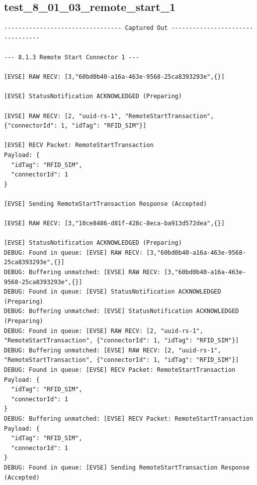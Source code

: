 \documentclass{article}
\begin{document}
\subsection*{test\_8\_01\_03\_remote\_start\_1}
\begin{lstlisting}
--------------------------------- Captured Out ---------------------------------

--- 8.1.3 Remote Start Connector 1 ---

[EVSE] RAW RECV: [3,"60bd0b40-a16a-463e-9568-25ca8393293e",{}]

[EVSE] StatusNotification ACKNOWLEDGED (Preparing)

[EVSE] RAW RECV: [2, "uuid-rs-1", "RemoteStartTransaction", {"connectorId": 1, "idTag": "RFID_SIM"}]

[EVSE] RECV Packet: RemoteStartTransaction
Payload: {
  "idTag": "RFID_SIM",
  "connectorId": 1
}

[EVSE] Sending RemoteStartTransaction Response (Accepted)

[EVSE] RAW RECV: [3,"10ce8486-d81f-428c-8eca-ba913d572dea",{}]

[EVSE] StatusNotification ACKNOWLEDGED (Preparing)
DEBUG: Found in queue: [EVSE] RAW RECV: [3,"60bd0b40-a16a-463e-9568-25ca8393293e",{}]
DEBUG: Buffering unmatched: [EVSE] RAW RECV: [3,"60bd0b40-a16a-463e-9568-25ca8393293e",{}]
DEBUG: Found in queue: [EVSE] StatusNotification ACKNOWLEDGED (Preparing)
DEBUG: Buffering unmatched: [EVSE] StatusNotification ACKNOWLEDGED (Preparing)
DEBUG: Found in queue: [EVSE] RAW RECV: [2, "uuid-rs-1", "RemoteStartTransaction", {"connectorId": 1, "idTag": "RFID_SIM"}]
DEBUG: Buffering unmatched: [EVSE] RAW RECV: [2, "uuid-rs-1", "RemoteStartTransaction", {"connectorId": 1, "idTag": "RFID_SIM"}]
DEBUG: Found in queue: [EVSE] RECV Packet: RemoteStartTransaction
Payload: {
  "idTag": "RFID_SIM",
  "connectorId": 1
}
DEBUG: Buffering unmatched: [EVSE] RECV Packet: RemoteStartTransaction
Payload: {
  "idTag": "RFID_SIM",
  "connectorId": 1
}
DEBUG: Found in queue: [EVSE] Sending RemoteStartTransaction Response (Accepted)
\end{lstlisting}
\end{document}
